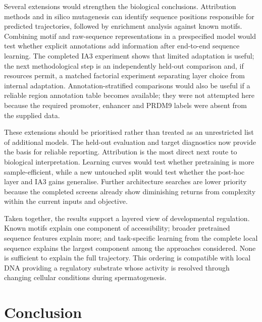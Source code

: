 \documentclass[a4paper,12pt]{article}
\begin{document}
Several extensions would strengthen the biological conclusions. Attribution methods and in silico mutagenesis can identify sequence positions responsible for predicted trajectories, followed by enrichment analysis against known motifs. Combining motif and raw-sequence representations in a prespecified model would test whether explicit annotations add information after end-to-end sequence learning. The completed IA3 experiment shows that limited adaptation is useful; the next methodological step is an independently held-out comparison and, if resources permit, a matched factorial experiment separating layer choice from internal adaptation. Annotation-stratified comparisons would also be useful if a reliable region annotation table becomes available; they were not attempted here because the required promoter, enhancer and PRDM9 labels were absent from the supplied data.

These extensions should be prioritised rather than treated as an unrestricted list of additional models. The held-out evaluation and target diagnostics now provide the basis for reliable reporting. Attribution is the most direct next route to biological interpretation. Learning curves would test whether pretraining is more sample-efficient, while a new untouched split would test whether the post-hoc layer and IA3 gains generalise. Further architecture searches are lower priority because the completed screens already show diminishing returns from complexity within the current inputs and objective.

Taken together, the results support a layered view of developmental regulation. Known motifs explain one component of accessibility; broader pretrained sequence features explain more; and task-specific learning from the complete local sequence explains the largest component among the approaches considered. None is sufficient to explain the full trajectory. This ordering is compatible with local DNA providing a regulatory substrate whose activity is resolved through changing cellular conditions during spermatogenesis.

\section{Conclusion}
\end{document}
